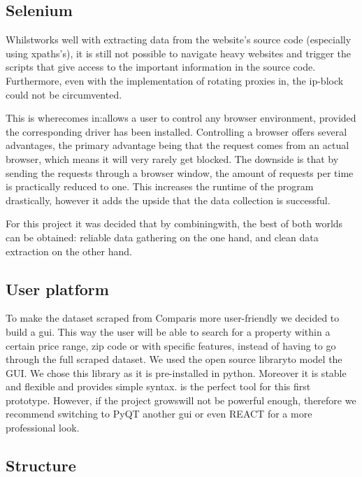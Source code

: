 \documentclass[main]{subfiles}
\begin{document}
\subsection{Selenium}
Whilst\pkg[Scrapy] works well with extracting data from the website's source code (especially using \acsp*{xpath}'s), 
it is still not possible to navigate \js heavy websites and trigger the scripts that give access to the important information in the source code.
Furthermore, even with the implementation of rotating proxies in\pkg[Scrapy], the \acs*{ip}-block could not be circumvented.

This is where\pkg[Selenium] comes in:\pkg[Selenium] allows a user to control any browser environment,
provided the corresponding driver has been installed.
Controlling a browser offers several advantages, the primary advantage being that the request comes from an actual browser,
which means it will very rarely get blocked. 
The downside is that by sending the requests through a browser window, 
the amount of requests per time is practically reduced to one.
This increases the runtime of the program drastically, 
however it adds the upside that the data collection is successful.

For this project it was decided that by combining\pkg[Selenium] with\pkg[Scrapy], the best of both worlds can be obtained:
reliable data gathering on the one hand, and clean data extraction on the other hand.


\subsection{User platform}
To make the dataset scraped from Comparis more user-friendly we decided to build a \ac{gui}.
This way the user will be able to search for a property within a certain price range, zip code or with specific features, 
instead of having to go through the full scraped dataset.
We used the open source library\pkg[tkinter] to model the GUI. We chose this library as it is pre-installed in python.
Moreover it is stable and flexible and provides simple syntax.
\pkg[tkinter] is the perfect tool for this first prototype. However, if the project grows\pkg[tkinter] will not be powerful enough,
therefore we recommend switching to PyQT another \ac{gui} or even REACT for a more professional look. 


\subsection{Structure}
\end{document}
